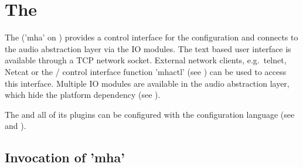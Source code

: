 
\section{The \mhad{}}\label{sec:linuxmhaserver}\label{sec:frameworks}

The \mhad{} ('mha' on \Linux{}) provides a control interface for 
the configuration and connects to the audio abstraction layer via the \mhad{} IO modules.
%
The text based user interface is available through a TCP network
socket.
%
External network clients, e.g.\ telnet, Netcat or the \Octave{}/ \Matlab{} control
interface function 'mhactl' (see ) can be used
to access this interface.
%
Multiple IO modules are available in the audio abstraction layer,
which hide the platform dependency (see
).
%

The \mhad{} and all of its plugins can be configured with the \mha{}
configuration language (see  and ).
%


\subsection{Invocation of 'mha'}

